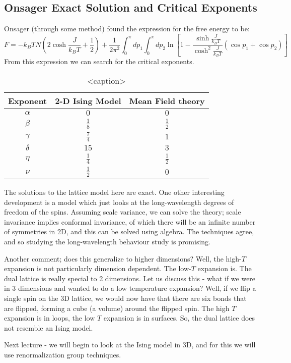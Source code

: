 \subsection{Onsager Exact Solution and Critical Exponents}
Onsager (through some method) found the expression for the free energy to be:
\begin{equation}
    F = -k_B T N \left(2\cosh\frac{J}{k_B T} + \frac{1}{2}\right) + \frac{1}{2\pi^2}\int_0^\pi dp_1 \int_0^\pi dp_2 \ln\left[1 - \frac{\sinh\frac{J}{k_B T}}{\cosh^2\frac{J}{k_B T}}\left(\cos p_1 + \cos p_2\right)\right]
\end{equation}
From this expression we can search for the critical exponents.
\begin{table}[htbp]
    \centering\begin{tabular}{|c|c|c|}
        \hline Exponent & 2-D Ising Model & Mean Field theory
        \\ \hline $\alpha$ & $0$ & $0$
        \\ $\beta$ & $\frac{1}{8}$ & $\frac{1}{2}$
        \\ $\gamma$ & $\frac{7}{4}$ & $1$
        \\ $\delta$ & $15$ & $3$
        \\ $\eta$ & $\frac{1}{4}$ & $\frac{1}{2}$
        \\ $\nu$ & $\frac{1}{2}$ & $0$
        \\ \hline
    \end{tabular}
    \caption{<caption>}
    \label{<label>}
\end{table}
The solutions to the lattice model here are exact. One other interesting development is a model which just looks at the long-wavelength degrees of freedom of the spins. Assuming scale variance, we can solve the theory; scale invariance implies conformal invariance, of which there will be an infinite number of symmetries in 2D, and this can be solved using algebra. The techniques agree, and so studying the long-wavelength behaviour study is promising.

Another comment; does this generalize to higher dimensions? Well, the high-$T$ expansion is not particularly dimension dependent. The low-$T$ expansion is. The dual lattice is really special to 2 dimensions. Let us discuss this - what if we were in 3 dimensions and wanted to do a low temperature expansion? Well, if we flip a single spin on the 3D lattice, we would now have that there are six bonds that are flipped, forming a cube (a volume) around the flipped spin. The high $T$ expansion is in loops, the low $T$ expansion is in surfaces. So, the dual lattice does not resemble an Ising model.

Next lecture - we will begin to look at the Ising model in 3D, and for this we will use renormalization group techniques.